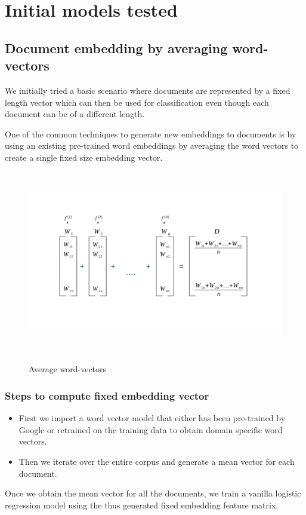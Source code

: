 \newpage
\section{Initial models tested}

\subsection{Document embedding by averaging word-vectors}

We initially tried a basic scenario where documents are represented by a fixed length vector which can then be used for classification even though each document can be of a different length.

One of the common techniques to generate new embeddings to documents is by using an existing pre-trained word embeddings by averaging the word vectors to create a single fixed size embedding vector.

\begin{figure}[htbp]
\centering
\includegraphics[width=16cm, height=8cm]{images/average-vectors.png}\\
\centering
\caption{Average word-vectors}
\label{fig:foo}
\end{figure}

\subsubsection{Steps to compute fixed embedding vector}

\begin{itemize}
\item {First we import a word vector model that either has been pre-trained by Google or retrained on the training data to obtain domain specific word vectors.}
\item {Then we iterate over the entire corpus and generate a mean vector for each document.}
\end{itemize}
Once we obtain the mean vector for all the documents, we train a vanilla logistic regression model using the thus generated fixed embedding feature matrix.


